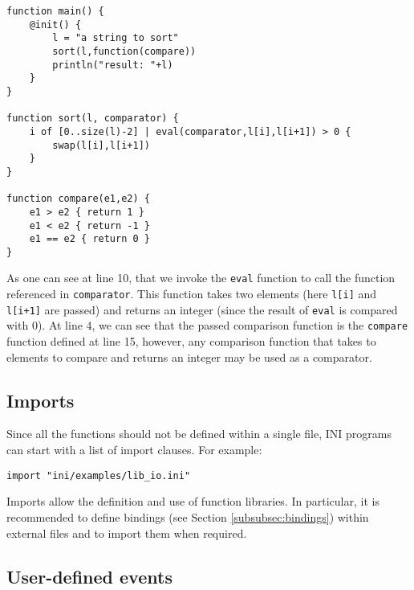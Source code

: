 \documentclass[11pt]{article}
\begin{document}
{ \small
\begin{lstlisting}
function main() {
	@init() {
		l = "a string to sort"
		sort(l,function(compare))
		println("result: "+l)
	}
}

function sort(l, comparator) {
	i of [0..size(l)-2] | eval(comparator,l[i],l[i+1]) > 0 {
		swap(l[i],l[i+1])
	}
}

function compare(e1,e2) {
	e1 > e2 { return 1 }
	e1 < e2 { return -1 }
	e1 == e2 { return 0 }
}
\end{lstlisting} }

As one can see at line 10, that we invoke the \texttt{eval} function to call the function referenced in \texttt{comparator}. This function takes two elements (here \texttt{l[i]} and \texttt{l[i+1]} are passed) and returns an integer (since the result of \texttt{eval} is compared with 0). At line 4, we can see that the passed comparison function is the \texttt{compare} function defined at line 15, however, any comparison function that takes to elements to compare and returns an integer may be used as a comparator.

\subsection{Imports\label{sec:imports}}

Since all the functions should not be defined within a single file, INI programs can start with a list of import clauses. For example:

\begin{lstlisting}[numbers=none]
import "ini/examples/lib_io.ini"
\end{lstlisting}

Imports allow the definition and use of function libraries. In particular, it is recommended to define bindings (see Section \ref{subsubsec:bindings}) within external files and to import them when required.

\subsection{User-defined events}
\end{document}
